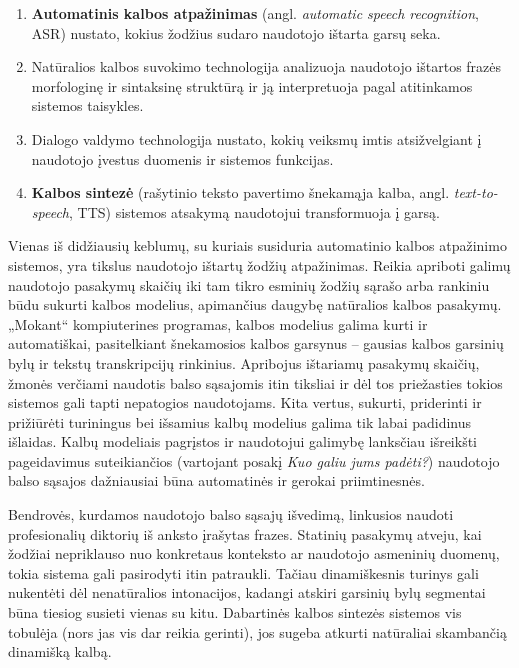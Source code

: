 \documentclass[]{../metanetpaper}
\begin{document}
\begin{multicols}{2}
\begin{enumerate}
\item \textbf{Automatinis kalbos atpažinimas} (angl. \textit{automatic speech recognition}, ASR) nustato, kokius žodžius sudaro naudotojo ištarta garsų seka.
\item Natūralios kalbos suvokimo technologija analizuoja naudotojo ištartos frazės morfologinę ir sintaksinę struktūrą ir ją interpretuoja pagal atitinkamos sistemos taisykles.
\item  Dialogo valdymo technologija nustato, kokių veiksmų imtis atsižvelgiant į naudotojo įvestus duomenis ir sistemos funkcijas.    
\item \textbf{Kalbos sintezė} (rašytinio teksto pavertimo šnekamąja kalba, angl. \textit{text-to-speech}, TTS) sistemos atsakymą naudotojui transformuoja į garsą.
\end{enumerate}

Vienas iš didžiausių keblumų, su kuriais susiduria automatinio kalbos atpažinimo sistemos, yra tikslus naudotojo ištartų žodžių atpažinimas. Reikia apriboti galimų naudotojo pasakymų skaičių iki tam tikro esminių žodžių sąrašo arba rankiniu būdu sukurti kalbos modelius, apimančius daugybę natūralios kalbos pasakymų. „Mokant“   kompiuterines programas, kalbos modelius galima kurti ir automatiškai, pasitelkiant šnekamosios kalbos garsynus – gausias kalbos garsinių bylų ir tekstų transkripcijų rinkinius. Apribojus ištariamų pasakymų skaičių, žmonės verčiami naudotis balso sąsajomis itin tiksliai ir dėl tos priežasties tokios sistemos gali tapti nepatogios naudotojams. Kita vertus, sukurti, priderinti ir prižiūrėti turiningus bei išsamius kalbų modelius galima tik labai padidinus išlaidas. Kalbų modeliais pagrįstos ir naudotojui galimybę lanksčiau išreikšti pageidavimus suteikiančios (vartojant posakį \textit{Kuo galiu jums padėti?}) naudotojo balso sąsajos dažniausiai būna automatinės ir gerokai priimtinesnės. 

Bendrovės, kurdamos naudotojo balso sąsajų išvedimą, linkusios naudoti profesionalių diktorių iš anksto įrašytas frazes. Statinių pasakymų atveju, kai žodžiai nepriklauso nuo konkretaus konteksto ar naudotojo asmeninių duomenų, tokia sistema gali pasirodyti itin patraukli. Tačiau dinamiškesnis turinys gali nukentėti dėl nenatūralios intonacijos, kadangi atskiri garsinių bylų segmentai būna tiesiog susieti vienas su kitu. Dabartinės kalbos sintezės sistemos vis tobulėja (nors jas vis dar reikia gerinti), jos sugeba atkurti natūraliai skambančią dinamišką kalbą.   


\end{multicols}
\end{document}
